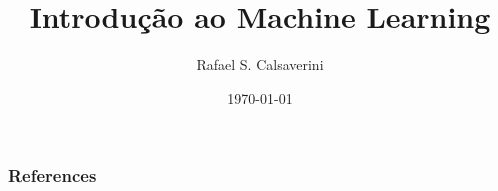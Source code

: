 \documentclass{beamer}
\begin{document}
\title[Introdução ao Machine Learning]{Introdução ao Machine Learning}
\author[RSC]{Rafael S. Calsaverini}
\date{\today}



\begin{frame}
\titlepage
\end{frame}
    



\begin{frame}[t,allowframebreaks]
    \frametitle{References}
    \printbibliography
\end{frame}
\end{document}
